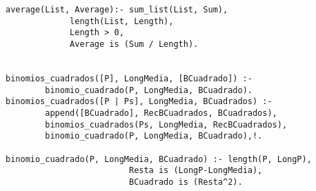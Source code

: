 \documentclass[spanish, 10pt,a4paper]{article}
\numberwithin{equation}{section} %
\begin{document}
\begin{lstlisting}
average(List, Average):- sum_list(List, Sum), 
			 length(List, Length), 
			 Length > 0, 
			 Average is (Sum / Length).


binomios_cuadrados([P], LongMedia, [BCuadrado]) :- 
		binomio_cuadrado(P, LongMedia, BCuadrado). 
binomios_cuadrados([P | Ps], LongMedia, BCuadrados) :- 
		append([BCuadrado], RecBCuadrados, BCuadrados), 
		binomios_cuadrados(Ps, LongMedia, RecBCuadrados), 
		binomio_cuadrado(P, LongMedia, BCuadrado),!.

binomio_cuadrado(P, LongMedia, BCuadrado) :- length(P, LongP), 
					     Resta is (LongP-LongMedia), 
					     BCuadrado is (Resta^2).
											 
\end{lstlisting}


\end{document}
